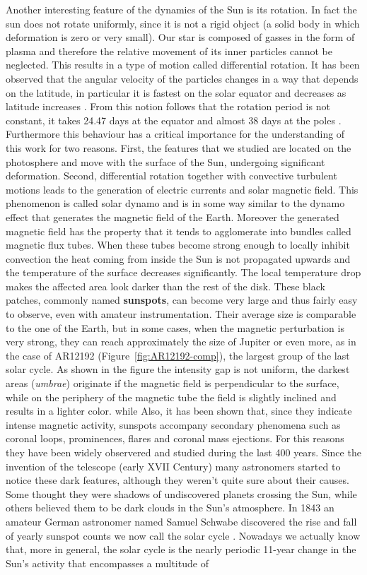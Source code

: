 Another interesting feature of the dynamics of the Sun is its rotation. In fact the sun does not rotate uniformly, since it is not a rigid object (a solid body in which deformation is zero or very small). Our star is composed of gasses in the form of plasma and therefore the relative movement of its inner particles cannot be neglected. This results in a type of motion called differential rotation. It has been observed that the angular velocity of the particles changes in a way that depends on the latitude, in particular it is fastest on the solar equator and decreases as latitude increases \cite{diffrot}. From this notion follows that the rotation period is not constant, it takes 24.47 days at the equator and almost 38 days at the poles \cite{diffrotrev}. Furthermore this behaviour has a critical importance for the understanding of this work for two reasons. First, the features that we studied are located on the photosphere and move with the surface of the Sun, undergoing significant deformation. Second, differential rotation together with convective turbulent motions leads to the generation of electric currents and solar magnetic field. This phenomenon is called solar dynamo and is in some way similar to the dynamo effect that generates the magnetic field of the Earth. Moreover the generated magnetic field has the property that it tends to agglomerate into bundles called magnetic flux tubes. When these tubes become strong enough to locally inhibit convection the heat coming from inside the Sun is not propagated upwards and the temperature of the surface decreases significantly. The local temperature drop makes the affected area look darker than the rest of the disk. These black patches, commonly named \textbf{sunspots}, can become very large and thus fairly easy to observe, even with amateur instrumentation. Their average size is comparable to the one of the Earth, but in some cases, when the magnetic perturbation is very strong, they can reach approximately the size of Jupiter or even more, as in the case of AR12192 (Figure~\ref{fig:AR12192-comp}), the largest group of the last solar cycle. As shown in the figure the intensity gap is not uniform, the darkest areas (\textit{umbrae}) originate if the magnetic field is perpendicular to the surface, while on the periphery of the magnetic tube the field is slightly inclined and results in a lighter color. while  Also, it has been shown that, since they indicate intense magnetic activity, sunspots accompany secondary phenomena such as coronal loops, prominences, flares and coronal mass ejections. For this reasons they have been widely observered and studied during the last 400 years. Since the invention of the telescope \cite{king2003history} (early XVII Century) many astronomers started to notice these dark features, although they weren't quite sure about their causes. Some thought they were shadows of undiscovered planets crossing the Sun, while others believed them to be dark clouds in the Sun's atmosphere. In 1843 an amateur German astronomer named Samuel Schwabe discovered the rise and fall of yearly sunspot counts we now call the solar cycle \cite{schwabe1843solar}. Nowadays we actually know that, more in general, the solar cycle is the nearly periodic 11-year change in the Sun's activity that encompasses a multitude of 